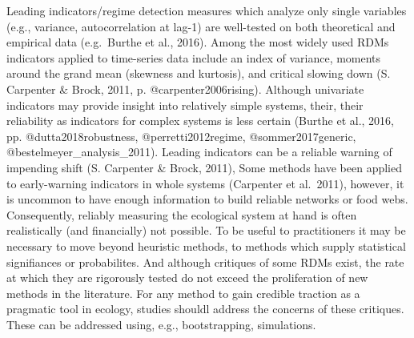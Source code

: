 \documentclass[12pt,twoside,openany]{reedthesis}
\begin{document}
Leading indicators/regime detection measures which analyze only single variables (e.g., variance, autocorrelation at lag-1) are well-tested on both theoretical and empirical data (e.g.~Burthe et al., 2016). Among the most widely used RDMs indicators applied to time-series data include an index of variance, moments around the grand mean (skewness and kurtosis), and critical slowing down (S. Carpenter \& Brock, 2011, p. @carpenter2006rising). Although univariate indicators may provide insight into relatively simple systems, their, their reliability as indicators for complex systems is less certain (Burthe et al., 2016, pp. @dutta2018robustness, @perretti2012regime, @sommer2017generic, @bestelmeyer\_analysis\_2011). Leading indicators can be a reliable warning of impending shift (S. Carpenter \& Brock, 2011), Some methods have been applied to early-warning indicators in whole systems (Carpenter et al.~2011), however, it is uncommon to have enough information to build reliable networks or food webs. Consequently, reliably measuring the ecological system at hand is often realistically (and financially) not possible. To be useful to practitioners it may be necessary to move beyond heuristic methods, to methods which supply statistical signifiances or probabilites. And although critiques of some RDMs exist, the rate at which they are rigorously tested do not exceed the proliferation of new methods in the literature. For any method to gain credible traction as a pragmatic tool in ecology, studies shouldl address the concerns of these critiques. These can be addressed using, e.g., bootstrapping, simulations.
\end{document}
